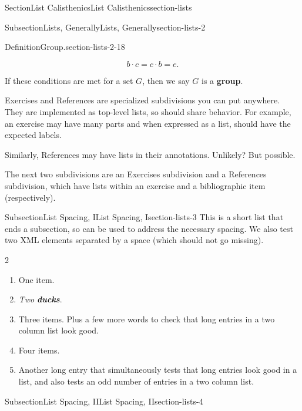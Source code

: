 \documentclass[twoside,10pt,]{article}
\newcommand{\alert}[1]{\textbf{\textit{#1}}}
\newcommand{\terminology}[1]{\textbf{#1}}
\numberwithin{equation}{section}
\begin{document}
\begin{sectionptx}{Section}{List Calisthenics}{}{List Calisthenics}{}{}{section-lists}
\begin{subsectionptx}{Subsection}{Lists, Generally}{}{Lists, Generally}{}{}{section-lists-2}
\begin{definition}{Definition}{Group.}{section-lists-2-18}
\begin{enumerate}[label={\alph*)}]
\begin{equation*}
b\cdot c=c\cdot b = e\text{.}
\end{equation*}
%
\end{enumerate}
%
\par
If these conditions are met for a set \(G\), then we say \(G\) is a \terminology{group}.%
\end{definition}
Exercises and References are specialized subdivisions you can put anywhere.  They are implemented as top-level lists, so should share behavior.  For example, an exercise may have many parts and when expressed as a list, should have the expected labels.%
\par
Similarly, References may have lists in their annotations.  Unlikely?  But possible.%
\par
The next two subdivisions are an Exercises subdivision and a References subdivision, which have lists within an exercise and a bibliographic item (respectively).%
\end{subsectionptx}
%
%
\typeout{************************************************}
\typeout{************************************************}
%
\begin{subsectionptx}{Subsection}{List Spacing, I}{}{List Spacing, I}{}{}{section-lists-3}
This is a short list that ends a subsection, so can be used to address the necessary spacing.  We also test two XML elements separated by a space (which should not go missing).%
\begin{multicols}{2}
\begin{enumerate}[label={(\alph*)}]
\item{}One item.%
\item{}\emph{Two} \alert{ducks}.%
\item{}Three items.  Plus a few more words to check that long entries in a two column list look good.%
\item{}Four items.%
\item{}Another long entry that simultaneously tests that long entries look good in a list, and also tests an odd number of entries in a two column list.%
\end{enumerate}
\end{multicols}
%
\end{subsectionptx}
%
%
\typeout{************************************************}
\typeout{************************************************}
%
\begin{subsectionptx}{Subsection}{List Spacing, II}{}{List Spacing, II}{}{}{section-lists-4}

\end{subsectionptx}
\end{sectionptx}
\end{document}

